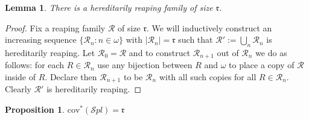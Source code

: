 \documentclass[a4paper]{amsart}
\newtheorem{lemma}[theorem]{Lemma}
\newtheorem{proposition}[theorem]{Proposition}
\newcommand{\rrr}{\mathfrak{r}}
\newcommand{\cov}{\mathrm{cov}}
\newcommand{\SPL}{\mathcal{S}pl}
\begin{document}
\begin{lemma}
    There is a hereditarily reaping family of size $\rrr$.
\end{lemma}
\begin{proof}
    Fix a reaping family $\mathcal{R}$ of size $\rrr$. We will inductively construct an increasing sequence $\{\mathcal{R}_{n}:n\in\omega\}$ with $|\mathcal{R}_{n}|=\rrr$ such that $\mathcal{R}':=\bigcup_{n}\mathcal{R}_{n}$ is hereditarily reaping. Let $\mathcal{R}_{0}=\mathcal{R}$ and to construct $\mathcal{R}_{n+1}$ out of $\mathcal{R}_{n}$ we do as follows: for each $R\in\mathcal{R}_{n}$ use any bijection between $R$ and $\omega$ to place a copy of $\mathcal{R}$ inside of $R$. Declare then $\mathcal{R}_{n+1}$ to be $\mathcal{R}_{n}$ with all such copies for all $R\in\mathcal{R}_{n}$. Clearly $\mathcal{R}'$ is hereditarily reaping.
\end{proof}
\begin{proposition}\label{covSplIsRRR}
    $\cov^{*}(\SPL)=\rrr$
\end{proposition}
\end{document}
